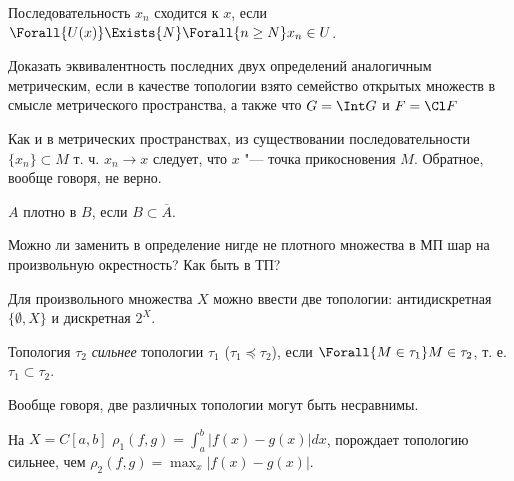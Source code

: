\documentclass[main]{subfiles}
\begin{document}
\begin{definition}
  Последовательность \( x_n \) сходится к \( x \), если
  \( \Forall{U(x)} \Exists{N} \Forall{n \ge N} x_n \in U \).
\end{definition}

\begin{exercise}
  Доказать эквивалентность последних двух определений аналогичным
  метрическим, если в качестве топологии взято семейство
  открытых множеств в смысле метрического пространства,
  а также что \( G = \Int G \) и \( F = \Cl F  \)
\end{exercise}

\begin{remark}
  Как и в метрических пространствах,
  из существовании последовательности
  \( \{ x_n \} \subset M \) т. ч. \( x_n \to x \)
  следует, что \( x \) "--- точка прикосновения \( M \).
  Обратное, вообще говоря, не верно.
\end{remark}

\begin{definition}
  \( A \) плотно в \( B \), если \( B \subset \overline{A} \).
\end{definition}

\begin{exercise}
  Можно ли заменить в определение нигде не плотного множества в МП
  шар на произвольную окрестность? Как быть в ТП?
\end{exercise}

\begin{example}
  Для произвольного множества \( X \) можно ввести две
  топологии: антидискретная \( \{ \emptyset, X \} \)
  и дискретная \( 2^X \).
\end{example}

\begin{definition}
  Топология \( \tau_2 \) \emph{сильнее} топологии \( \tau_1 \)
  (\( \tau_1 \preceq \tau_2 \)),
  если \( \Forall{M \in \tau_1} M \in \tau_2 \),
  т. е. \( \tau_1 \subset \tau_2 \).
\end{definition}

\begin{remark}
  Вообще говоря, две различных топологии могут быть несравнимы.
\end{remark}

\begin{example}
  На \( X = C[a, b] \) \( \rho_1(f, g) = \int_a^b |f(x) - g(x)| dx \),
  порождает топологию сильнее, чем
  \( \rho_2(f, g) = \max_x |f(x) - g(x)| \).
\end{example}
\end{document}
